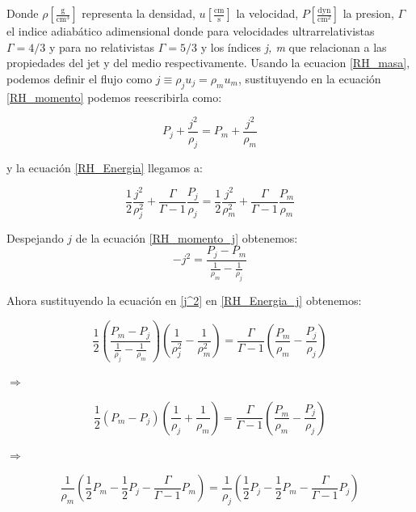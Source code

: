 \documentclass[12pt,a4paper]{book}
\begin{document}
Donde $\rho \left[\frac{\mathrm{g}}{\mathrm{cm}^3}\right]$ representa la densidad, $u \left[\frac{\mathrm{cm}}{\mathrm{s} }\right]$ la velocidad, 
$P \left[\frac{\mathrm{dyn}}{\mathrm{cm}^2} \right]$ la presion, $\Gamma$ el indice adiabático adimensional donde para velocidades ultrarrelativistas 
$\Gamma = 4/3$ y para no relativistas $\Gamma = 5/3$ y los índices \textit{j, m} que  relacionan a las propiedades del jet y del medio respectivamente. Usando la ecuacion \ref{RH_masa}, podemos definir el flujo como $j \equiv \rho_j u_j = \rho_m u_m$, sustituyendo en la ecuación \ref{RH_momento} podemos reescribirla como:

\begin{equation}\label{RH_momento_j}
P_{j}+\frac{j^2}{\rho_{j}}=P_{m}+\frac{j^2}{\rho_{m}}
\end{equation}

y la ecuación \ref{RH_Energia} llegamos a:

\begin{equation}\label{RH_Energia_j}
\frac{1}{2} \frac{j^{2}}{\rho_{j}^2}+\frac{\Gamma}{\Gamma-1} \frac{P_{j}}{\rho_{j}}=
\frac{1}{2} \frac{j^{2}}{\rho_{m}^2}+\frac{\Gamma}{\Gamma-1} \frac{P_{m}}{\rho_{m}}
\end{equation}

Despejando $j$ de la ecuación \ref{RH_momento_j} obtenemos:
\begin{equation}\label{j^2}
-j^{2}=\frac{P_{j}-P_{m}}{\frac{1}{\rho_{m}}-\frac{1}{\rho_{j}}}
\end{equation}

Ahora sustituyendo la ecuación en \ref{j^2} en \ref{RH_Energia_j} obtenemos:

\begin{equation*}
\frac{1}{2} \left( \frac{P_{m}-P_{j}}{\frac{1}{\rho_{j}}-\frac{1}{\rho_{m}}} \right)
\left(\frac{1}{\rho_{j}^{2}}-\frac{1}{\rho_{m}^{2}} \right)
=
\frac{\Gamma}{\Gamma-1}
\left( \frac{P_{m}}{\rho_{m}}-\frac{P_{j}}{\rho_{j}} \right)
\end{equation*}

$\Rightarrow$

\begin{equation*}
\frac{1}{2}	\left( P_{m} - P_{j} \right)
\left( \frac{1}{\rho_{j}}+\frac{1}{\rho_{m}} \right)
=
\frac{\Gamma}{\Gamma-1}
\left( \frac{P_{m}}{\rho_{m}}-\frac{P_{j}}{\rho_{j}} \right)
\end{equation*}

$\Rightarrow$

\begin{equation*}
\frac{1}{\rho_{m}} \left( \frac{1}{2} P_{m}- \frac{1}{2} P_{j}-
\frac{\Gamma}{\Gamma-1} P_{m} \right)
=
\frac{1}{\rho_{j}} \left( \frac{1}{2} P_{j}- \frac{1}{2} P_{m}-
\frac{\Gamma}{\Gamma-1} P_{j} \right)
\end{equation*}
\end{document}

